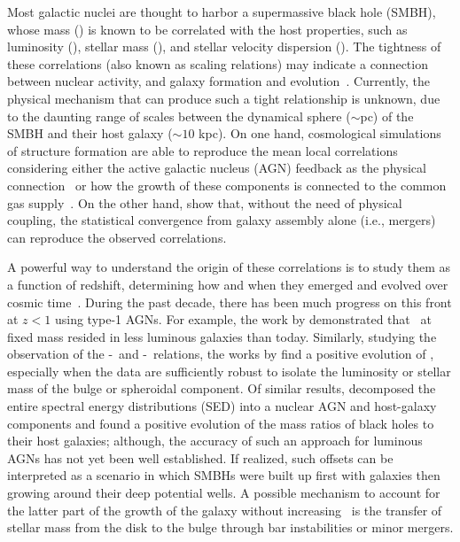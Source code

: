 \documentclass[apj]{emulateapj}
\begin{document}
Most galactic nuclei are thought to harbor a supermassive black hole (SMBH), whose mass (\mbh) is known to be correlated with the host properties, such as luminosity (\lhost), stellar mass (\smass), and stellar velocity dispersion (\sigstar). The tightness of these correlations (also known as scaling relations) may indicate a connection between nuclear activity, and galaxy formation and evolution~\citep[e.g.,][]{Mag++98, F+M00, M+H03, Gul++09,Beifi2012, H+R04, Geb++01b, Gra++2011}.
Currently, the physical mechanism that can produce such a tight relationship is unknown, due to the daunting range of scales between the dynamical sphere ($\sim$pc) of the SMBH and their host galaxy ($\sim10$ kpc). On one hand, cosmological simulations of structure formation are able to reproduce the mean local correlations considering either the active galactic nucleus (AGN) feedback as the physical connection~\citep{Springel2005, Hopkins2008, Matteo2008, DeG++15} or how the growth of these components is connected to the common gas supply~\citep{Cen2015, Menci2016}.
On the other hand, \citet{Peng2007, Jahnke2011, Hirschmann2010} show that, without the need of physical coupling, the statistical convergence from galaxy assembly alone (i.e., mergers) can reproduce the observed correlations.

A powerful way to understand the origin of these correlations is to study them as a function of redshift, determining how and when they emerged and evolved over cosmic time~\citep[e.g.,][]{TMB04,Sal++06,Woo++06, Jah++09,SS13,Sun2015}. During the past decade, there has been much progress on this front at $z<1$ using type-1 AGNs. For example, the work by \citet{Park15, Tre++07, Pen++06qsob} demonstrated that \mbh\ at fixed mass resided in less luminous galaxies than today. Similarly, studying the observation of the \mbh-\smass\ and \mbh-\sigstar\ relations, the works by \citet{Bennert11, Woo++08} find a positive evolution of \mbh, especially when the data are sufficiently robust to isolate the luminosity or stellar mass of the bulge or spheroidal component. Of similar results, \citet{Merloni2010} decomposed the entire spectral energy distributions (SED) into a nuclear AGN and host-galaxy components and found a positive evolution of the mass ratios of black holes to their host galaxies; although, the accuracy of such an approach for luminous AGNs has not yet been well established. If realized, such offsets can be interpreted as a scenario in which SMBHs were built up first with galaxies then growing around their deep potential wells.  A possible mechanism to account for the latter part of the growth of the galaxy without increasing \mbh\ is the transfer of stellar mass from the disk to the bulge \citep{Bennert++2011} through bar instabilities or minor mergers. 
\end{document}
